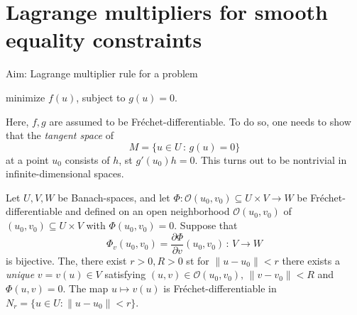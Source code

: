\documentclass[../skript.tex]{subfiles}
\begin{document}
\section{Lagrange multipliers for smooth equality constraints}\label{sec:c1e3}
Aim: Lagrange multiplier rule for a problem 
\begin{problemnonumb}
	minimize $f(u)$, subject to $g(u) = 0$.
\end{problemnonumb}
Here, $f,g$ are assumed to be Fréchet-differentiable. To do so, one needs to show that the \emph{tangent space} of
\[
	M=\{u\in U\,:\,g(u)=0\}
\]
at a point $u_0$ consists of $h$, \ac{st} $g'(u_0)h = 0$. This turns out to be nontrivial in infinite-dimensional spaces.
\begin{theorem}\label{thm:c1e26}
	Let $U,V,W$ be Banach-spaces, and let $\Phi:\mathcal{O}(u_0,v_0)\subseteq U\times V\to W$ %
	be Fréchet-differentiable and defined on an open neighborhood $\mathcal{O}(u_0,v_0)$ of $(u_0,v_0)\subseteq U\times V$ with $\Phi(u_0,v_0) = 0$.
	Suppose that 
	\[
		\Phi_v(u_0,v_0)=\frac{\partial\Phi}{\partial v}(u_0,v_0)\,:\,V\to W
	\]
	is bijective. The, there exist $r>0, R>0$ \ac{st} for $\|u-u_0\|<r$ there exists a \emph{unique} $v=v(u)\in V$ satisfying $(u,v)\in\mathcal{O}(u_0,v_0),\,\|v-v_0\|<R$ and $\Phi(u,v) = 0$. The map $u\mapsto v(u)$ is Fréchet-differentiable in $N_r=\{u\in U:\|u-u_0\|<r\}$. 
\end{theorem}
\end{document}
